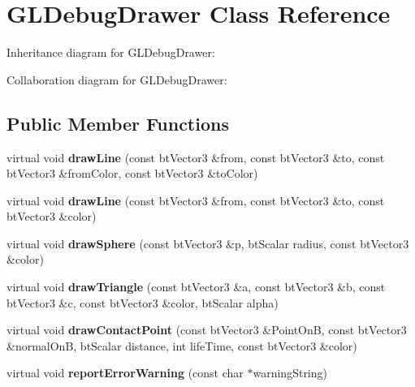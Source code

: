 \hypertarget{class_g_l_debug_drawer}{\section{G\+L\+Debug\+Drawer Class Reference}
\label{class_g_l_debug_drawer}
}


Inheritance diagram for G\+L\+Debug\+Drawer\+:


Collaboration diagram for G\+L\+Debug\+Drawer\+:
\subsection*{Public Member Functions}
\begin{DoxyCompactItemize}
\item 
\hypertarget{class_g_l_debug_drawer_aa5f34e6d733df7e464664228962679a1}{virtual void {\bfseries draw\+Line} (const bt\+Vector3 \&from, const bt\+Vector3 \&to, const bt\+Vector3 \&from\+Color, const bt\+Vector3 \&to\+Color)}\label{class_g_l_debug_drawer_aa5f34e6d733df7e464664228962679a1}

\item 
\hypertarget{class_g_l_debug_drawer_a4f37715bd5fbec4eae17285bcd3024ad}{virtual void {\bfseries draw\+Line} (const bt\+Vector3 \&from, const bt\+Vector3 \&to, const bt\+Vector3 \&color)}\label{class_g_l_debug_drawer_a4f37715bd5fbec4eae17285bcd3024ad}

\item 
\hypertarget{class_g_l_debug_drawer_a7b649dcd29a47ca23e62e2a9848eb1eb}{virtual void {\bfseries draw\+Sphere} (const bt\+Vector3 \&p, bt\+Scalar radius, const bt\+Vector3 \&color)}\label{class_g_l_debug_drawer_a7b649dcd29a47ca23e62e2a9848eb1eb}

\item 
\hypertarget{class_g_l_debug_drawer_ade1787b66fde7f134eae9b35fe74d7f8}{virtual void {\bfseries draw\+Triangle} (const bt\+Vector3 \&a, const bt\+Vector3 \&b, const bt\+Vector3 \&c, const bt\+Vector3 \&color, bt\+Scalar alpha)}\label{class_g_l_debug_drawer_ade1787b66fde7f134eae9b35fe74d7f8}

\item 
\hypertarget{class_g_l_debug_drawer_aa2373d114bd57438ae3eb7319d6052f2}{virtual void {\bfseries draw\+Contact\+Point} (const bt\+Vector3 \&Point\+On\+B, const bt\+Vector3 \&normal\+On\+B, bt\+Scalar distance, int life\+Time, const bt\+Vector3 \&color)}\label{class_g_l_debug_drawer_aa2373d114bd57438ae3eb7319d6052f2}

\item 
\hypertarget{class_g_l_debug_drawer_a4bd03c9b18d0359dfd6d3e9450e327f8}{virtual void {\bfseries report\+Error\+Warning} (const char $\ast$warning\+String)}\label{class_g_l_debug_drawer_a4bd03c9b18d0359dfd6d3e9450e327f8}


\end{DoxyCompactItemize}
